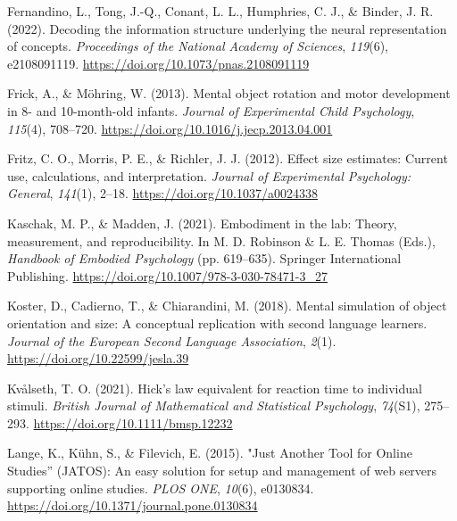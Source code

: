 \documentclass[
  man,mask,floatsintext]{apa7}
\newlength{\cslhangindent}
\newlength{\cslentryspacingunit} %
\newenvironment{CSLReferences}[2] %
 {%
  \setlength{\parindent}{0pt}
  \ifodd #1
  \let\oldpar\par
  \def\par{\hangindent=\cslhangindent\oldpar}
  \fi
  \setlength{\parskip}{#2\cslentryspacingunit}
 }%
 {}
\begin{document}
\begin{CSLReferences}{1}{0}
\leavevmode{}%
Fernandino, L., Tong, J.-Q., Conant, L. L., Humphries, C. J., \& Binder, J. R. (2022). Decoding the information structure underlying the neural representation of concepts. \emph{Proceedings of the National Academy of Sciences}, \emph{119}(6), e2108091119. \url{https://doi.org/10.1073/pnas.2108091119}

\leavevmode{}%
Frick, A., \& Möhring, W. (2013). Mental object rotation and motor development in 8- and 10-month-old infants. \emph{Journal of Experimental Child Psychology}, \emph{115}(4), 708--720. \url{https://doi.org/10.1016/j.jecp.2013.04.001}

\leavevmode{}%
Fritz, C. O., Morris, P. E., \& Richler, J. J. (2012). Effect size estimates: Current use, calculations, and interpretation. \emph{Journal of Experimental Psychology: General}, \emph{141}(1), 2--18. \url{https://doi.org/10.1037/a0024338}

\leavevmode{}%
Kaschak, M. P., \& Madden, J. (2021). Embodiment in the {lab}: {Theory}, {measurement}, and {reproducibility}. In M. D. Robinson \& L. E. Thomas (Eds.), \emph{Handbook of {Embodied Psychology}} (pp. 619--635). {Springer International Publishing}. \url{https://doi.org/10.1007/978-3-030-78471-3_27}

\leavevmode{}%
Koster, D., Cadierno, T., \& Chiarandini, M. (2018). Mental simulation of object orientation and size: {A} conceptual replication with second language learners. \emph{Journal of the European Second Language Association}, \emph{2}(1). \url{https://doi.org/10.22599/jesla.39}

\leavevmode{}%
Kvålseth, T. O. (2021). Hick's law equivalent for reaction time to individual stimuli. \emph{British Journal of Mathematical and Statistical Psychology}, \emph{74}(S1), 275--293. \url{https://doi.org/10.1111/bmsp.12232}

\leavevmode{}%
Lange, K., Kühn, S., \& Filevich, E. (2015). "{Just Another Tool} for {Online Studies}'' ({JATOS}): {An} easy solution for setup and management of web servers supporting online studies. \emph{PLOS ONE}, \emph{10}(6), e0130834. \url{https://doi.org/10.1371/journal.pone.0130834}


\end{CSLReferences}
\end{document}
